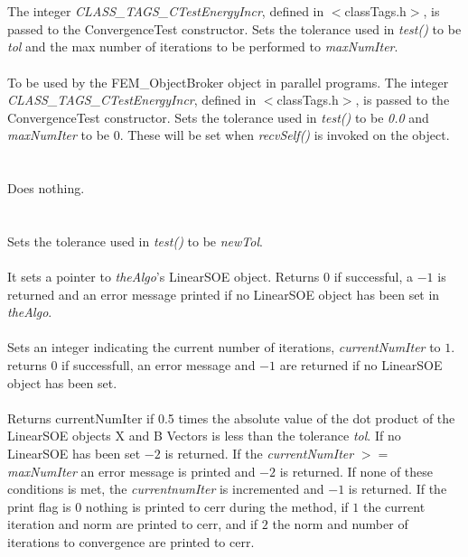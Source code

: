   \\
  \\
The integer {\em CLASS\_TAGS\_CTestEnergyIncr}, defined in
$<$classTags.h$>$, is passed to the ConvergenceTest constructor. Sets
the tolerance used in {\em test()} to be {\em tol} and the max number
of iterations to be performed to {\em maxNumIter}. \\

  \\
To be used by the FEM\_ObjectBroker object in parallel programs. The
integer {\em CLASS\_TAGS\_CTestEnergyIncr}, defined in
$<$classTags.h$>$, is passed to the ConvergenceTest constructor. Sets
the tolerance used in {\em test()} to be {\em 0.0} and {\em maxNumIter} 
to be $0$. These will be set when {\em recvSelf()} is invoked on the object. \\


 \\
 \\ 
Does nothing. \\

  \\
 \\
Sets the tolerance used in {\em test()} to be {\em newTol}. \\

 \\
It sets a pointer to {\em theAlgo}'s LinearSOE object. Returns $0$ if
successful, a $-1$ is returned and an error message printed if no
LinearSOE object has been set in {\em theAlgo}. \\


 \\
Sets an integer indicating the current number of iterations, {\em
currentNumIter} to $1$. returns $0$ if successfull, an error message
and $-1$ are returned if no LinearSOE object has been set. \\

 \\
Returns {currentNumIter} if 0.5 times the absolute value of the dot product of
the LinearSOE objects X and B Vectors is less than the tolerance {\em
tol}. If no LinearSOE has been set $-2$ is returned. If the {\em
currentNumIter} $>=$ {\em maxNumIter} an error message is printed and
$-2$ is returned. If none of these conditions is met, the {\em
currentnumIter} is incremented and $-1$ is returned. If the print flag
is $0$ nothing is printed to 
cerr during the method, if $1$ the current iteration and norm are
printed to cerr, and if $2$ the norm and number of iterations to convergence
are printed to cerr. \\ 


